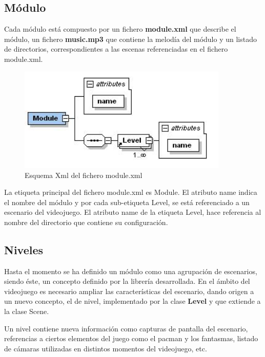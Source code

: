 \subsection{Módulo}

Cada módulo está compuesto por un fichero \textbf{module.xml} que describe el módulo, un fichero \textbf{music.mp3} que contiene la melodía del módulo y un listado de directorios, correspondientes a las escenas referenciadas en el fichero module.xml.

\begin{figure}[h]
\centering
\includegraphics[width=10cm]{img/EsquemaXmlModulo.jpg}	
\caption{Esquema Xml del fichero module.xml}
\end{figure}



La etiqueta principal del fichero module.xml es Module. El atributo name indica el nombre del módulo y por cada sub-etiqueta Level, se está referenciado a un escenario del videojuego. El atributo name de la etiqueta Level, hace referencia al nombre del directorio que contiene su configuración.

\subsection{Niveles}

Hasta el momento se ha definido un módulo como una agrupación de escenarios, siendo éste, un concepto definido por la librería desarrollada. En el ámbito del videojuego es necesario ampliar las características del escenario, dando origen a un nuevo concepto, el de nivel, implementado por la clase \textbf{Level} y que extiende a la clase Scene.
\newline

Un nivel contiene nueva información como capturas de pantalla del escenario, referencias a ciertos elementos del juego como el pacman y los fantasmas, listado de cámaras utilizadas en distintos momentos del videojuego, etc.
\newline


